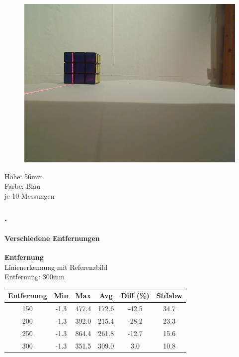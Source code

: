 \documentclass[xcolor=dvipsnames]{beamer}
\def\frametitlesec{\frametitle{\arabic{section}.\hspace{0.5ex}\insertsection}}
\def\framesubtitles#1{\framesubtitle{\hspace{3.5ex}#1}}
\begin{document}
\begin{frame}
\begin{figure}
\begin{minipage}{0.32\linewidth}
		\end{minipage}
		\hfill
		\begin{minipage}{0.32\linewidth}
			\includegraphics[width=\linewidth]{includes/test_dist_3}
		\end{minipage}
	\end{figure}
	Höhe: 56mm\\
	Farbe: Blau\\
	je 10 Messungen
	
\end{frame}

\begin{frame}
	\frametitlesec
	\framesubtitles{Verschiedene Entfernungen}
		\textbf{Entfernung}\\
		
		Linienerkennung mit Referenzbild\\
		Entfernung: 300mm
		
		\begin{tabular}{c|c|c|c|c|c}
			Entfernung & Min & Max & Avg & Diff (\%) & Stdabw\\ \hline
150 &      -1.3 & 477.4 & 172.6 & -42.5 & 34.7\\
200 &      -1.3 & 392.0 & 215.4 & -28.2 & 23.3\\
250 &      -1.3 & 864.4 & 261.8 & -12.7 & 15.6\\
300 &      -1.3 & 351.5 & 309.0 & 3.0 & 10.8\\

		\end{tabular}
		
		
\end{frame}
\end{document}
